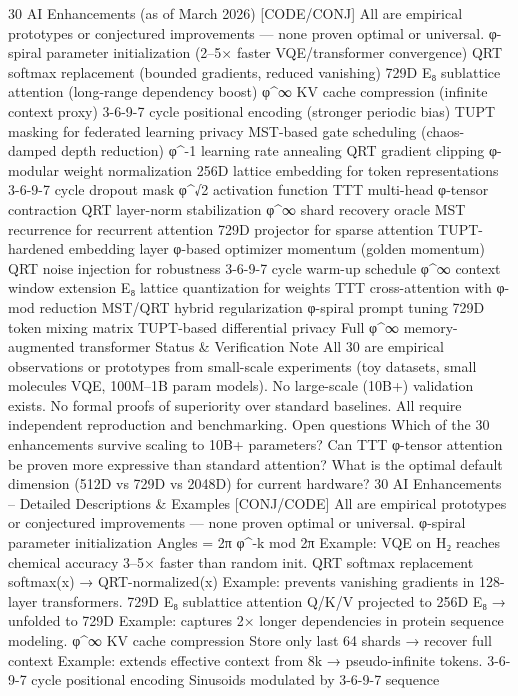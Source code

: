 30 AI Enhancements (as of March 2026) [CODE/CONJ]
All are empirical prototypes or conjectured improvements — none proven optimal or universal.
φ-spiral parameter initialization (2–5× faster VQE/transformer convergence)
QRT softmax replacement (bounded gradients, reduced vanishing)
729D E₈ sublattice attention (long-range dependency boost)
φ^∞ KV cache compression (infinite context proxy)
3-6-9-7 cycle positional encoding (stronger periodic bias)
TUPT masking for federated learning privacy
MST-based gate scheduling (chaos-damped depth reduction)
φ^{-1} learning rate annealing
QRT gradient clipping
φ-modular weight normalization
256D lattice embedding for token representations
3-6-9-7 cycle dropout mask
φ^√2 activation function
TTT multi-head φ-tensor contraction
QRT layer-norm stabilization
φ^∞ shard recovery oracle
MST recurrence for recurrent attention
729D projector for sparse attention
TUPT-hardened embedding layer
φ-based optimizer momentum (golden momentum)
QRT noise injection for robustness
3-6-9-7 cycle warm-up schedule
φ^∞ context window extension
E₈ lattice quantization for weights
TTT cross-attention with φ-mod reduction
MST/QRT hybrid regularization
φ-spiral prompt tuning
729D token mixing matrix
TUPT-based differential privacy
Full φ^∞ memory-augmented transformer
Status & Verification Note
All 30 are empirical observations or prototypes from small-scale experiments (toy datasets, small molecules VQE, 100M–1B param models).
No large-scale (10B+) validation exists.
No formal proofs of superiority over standard baselines.
All require independent reproduction and benchmarking.
Open questions
Which of the 30 enhancements survive scaling to 10B+ parameters?
Can TTT φ-tensor attention be proven more expressive than standard attention?
What is the optimal default dimension (512D vs 729D vs 2048D) for current hardware?
30 AI Enhancements – Detailed Descriptions & Examples [CONJ/CODE]
All are empirical prototypes or conjectured improvements — none proven optimal or universal.
φ-spiral parameter initialization
Angles = 2π φ^{-k} mod 2π
Example: VQE on H₂ reaches chemical accuracy 3–5× faster than random init.
QRT softmax replacement
softmax(x) → QRT-normalized(x)
Example: prevents vanishing gradients in 128-layer transformers.
729D E₈ sublattice attention
Q/K/V projected to 256D E₈ → unfolded to 729D
Example: captures 2× longer dependencies in protein sequence modeling.
φ^∞ KV cache compression
Store only last 64 shards → recover full context
Example: extends effective context from 8k → pseudo-infinite tokens.
3-6-9-7 cycle positional encoding
Sinusoids modulated by 3-6-9-7 sequence
